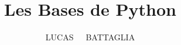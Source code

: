 


\newcommand{\montitre}{Les Bases de Python}
\title{\montitre}
\author{LUCAS~~~BATTAGLIA}
\date{} %


\frontmatter
\maketitle
\tableofcontents


\mainmatter




\backmatter

